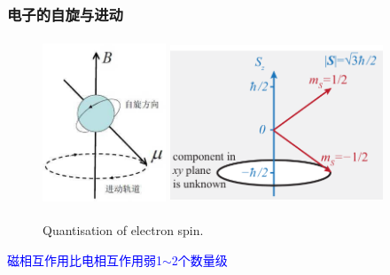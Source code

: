 \frame
{
	\frametitle{电子的自旋与进动}
\begin{figure}[h!]
\vspace*{-0.08in}
\centering
\includegraphics[height=1.95in,width=1.45in,viewport=0 0 210 270,clip]{Figures/Spin_spinor.jpg}
\includegraphics[height=1.95in,width=2.50in,viewport=0 0 580 415,clip]{Figures/Quantization-electron-spin.png}
\caption{\tiny \textrm{Quantisation of electron spin.}}%
\label{Fig:Electron-spin-spinor}
\end{figure}
\textcolor{blue}{磁相互作用比电相互作用弱1$\sim$2个数量级}
}

